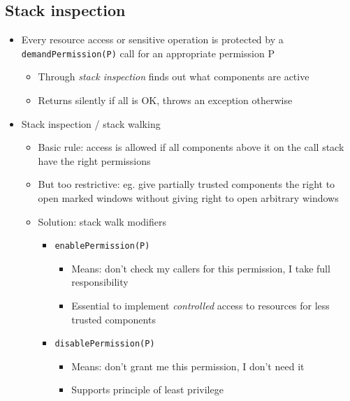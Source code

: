 \documentclass[12pt,titlepage,a4paper]{report}
\begin{document}
			\subsection{Stack inspection}
			\begin{itemize}
				\item Every resource access or sensitive operation is protected by a \texttt{demandPermission(P)} call for an appropriate permission P
				\begin{itemize}
					\item Through \textit{stack inspection} finds out what components are active
					\item Returns silently if all is OK, throws an exception otherwise
				\end{itemize}
				\item Stack inspection / stack walking
				\begin{itemize}
					\item Basic rule: access is allowed if all components above it on the call stack have the right permissions
					\item But too restrictive: eg. give partially trusted components the right to open marked windows without giving right to open arbitrary windows
					\item Solution: stack walk modifiers
					\begin{itemize}
						\item \texttt{enablePermission(P)}
						\begin{itemize}
							\item Means: don't check my callers for this permission, I take full responsibility
							\item Essential to implement \emph{controlled} access to resources for less trusted components
						\end{itemize}
						\item \texttt{disablePermission(P)}
						\begin{itemize}
							\item Means: don't grant me this permission, I don't need it
							\item Supports principle of least privilege
						\end{itemize}
					\end{itemize}
				\end{itemize}
			\end{itemize}
			
\end{document}
